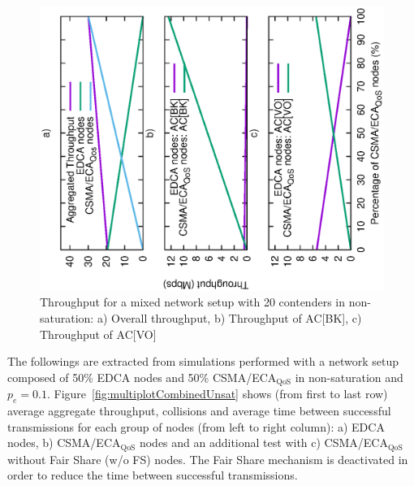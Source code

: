 \begin{figure}[t!]
	\centering
		\includegraphics[width=1.1\linewidth,angle = -90]{figures/legacyEvolution.eps}
		\caption{Throughput for a mixed network setup with 20 contenders in non-saturation: a) Overall throughput, b) Throughput of AC[BK], c) Throughput of AC[VO]}
		\label{fig:legacyEvolution}
\end{figure}
	
The followings are extracted from simulations performed with a network setup composed of 50\% EDCA nodes and 50\% CSMA/ECA$_{\text{QoS}}$ in non-saturation and $p_e=0.1$. Figure~\ref{fig:multiplotCombinedUnsat} shows (from first to last row) average aggregate throughput, collisions and average time between successful transmissions for each group of nodes (from left to right column): a) EDCA nodes, b) CSMA/ECA$_{\text{QoS}}$ nodes and an additional test with c) CSMA/ECA$_{\text{QoS}}$ without Fair Share (w/o FS) nodes. The Fair Share mechanism is deactivated in order to reduce the time between successful transmissions.



